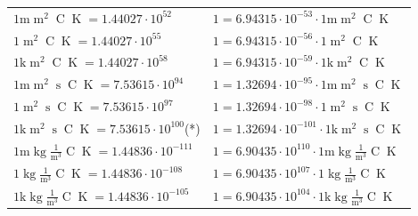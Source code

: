 \begin{center}
\begin{longtable}{l l}
{\color{gray}$1 \bm{\mathrm{ m}}{\operatorname{m}^2}{}{\operatorname{C}}{\operatorname{K}} = 1.44027\cdot10^{52} $}   & {\color{gray}$ 1 = 6.94315\cdot10^{-53} \cdot 1 \bm{\mathrm{ m}}{\operatorname{m}^2}{}{\operatorname{C}}{\operatorname{K}}$}  \\
{\color{black}$1 \bm{\mathrm{ }}{\operatorname{m}^2}{}{\operatorname{C}}{\operatorname{K}} = 1.44027\cdot10^{55} $}   & {\color{black}$ 1 = 6.94315\cdot10^{-56} \cdot 1 \bm{\mathrm{ }}{\operatorname{m}^2}{}{\operatorname{C}}{\operatorname{K}}$}  \\
{\color{gray}$1 \bm{\mathrm{ k}}{\operatorname{m}^2}{}{\operatorname{C}}{\operatorname{K}} = 1.44027\cdot10^{58} $}   & {\color{gray}$ 1 = 6.94315\cdot10^{-59} \cdot 1 \bm{\mathrm{ k}}{\operatorname{m}^2}{}{\operatorname{C}}{\operatorname{K}}$}  \\
{\color{gray}$1 \bm{\mathrm{ m}}{\operatorname{m}^2}{\operatorname{s}}{\operatorname{C}}{\operatorname{K}} = 7.53615\cdot10^{94} $}   & {\color{gray}$ 1 = 1.32694\cdot10^{-95} \cdot 1 \bm{\mathrm{ m}}{\operatorname{m}^2}{\operatorname{s}}{\operatorname{C}}{\operatorname{K}}$}  \\
{\color{black}$1 \bm{\mathrm{ }}{\operatorname{m}^2}{\operatorname{s}}{\operatorname{C}}{\operatorname{K}} = 7.53615\cdot10^{97} $}   & {\color{black}$ 1 = 1.32694\cdot10^{-98} \cdot 1 \bm{\mathrm{ }}{\operatorname{m}^2}{\operatorname{s}}{\operatorname{C}}{\operatorname{K}}$}  \\
{\color{gray}$1 \bm{\mathrm{ k}}{\operatorname{m}^2}{\operatorname{s}}{\operatorname{C}}{\operatorname{K}} = 7.53615\cdot10^{100} $}\quad(*) & {\color{gray}$ 1 = 1.32694\cdot10^{-101} \cdot 1 \bm{\mathrm{ k}}{\operatorname{m}^2}{\operatorname{s}}{\operatorname{C}}{\operatorname{K}}$}  \\
\hline{\color{gray}$1 \bm{\mathrm{ m}}\operatorname{kg}\frac1{\operatorname{m}^3}{}{\operatorname{C}}{\operatorname{K}} = 1.44836\cdot10^{-111} $}   & {\color{gray}$ 1 = 6.90435\cdot10^{110} \cdot 1 \bm{\mathrm{ m}}\operatorname{kg}\frac1{\operatorname{m}^3}{}{\operatorname{C}}{\operatorname{K}}$}  \\
{\color{black}$1 \bm{\mathrm{ }}\operatorname{kg}\frac1{\operatorname{m}^3}{}{\operatorname{C}}{\operatorname{K}} = 1.44836\cdot10^{-108} $}   & {\color{black}$ 1 = 6.90435\cdot10^{107} \cdot 1 \bm{\mathrm{ }}\operatorname{kg}\frac1{\operatorname{m}^3}{}{\operatorname{C}}{\operatorname{K}}$}  \\
{\color{gray}$1 \bm{\mathrm{ k}}\operatorname{kg}\frac1{\operatorname{m}^3}{}{\operatorname{C}}{\operatorname{K}} = 1.44836\cdot10^{-105} $}   & {\color{gray}$ 1 = 6.90435\cdot10^{104} \cdot 1 \bm{\mathrm{ k}}\operatorname{kg}\frac1{\operatorname{m}^3}{}{\operatorname{C}}{\operatorname{K}}$}  \\

\end{longtable}
\end{center}
